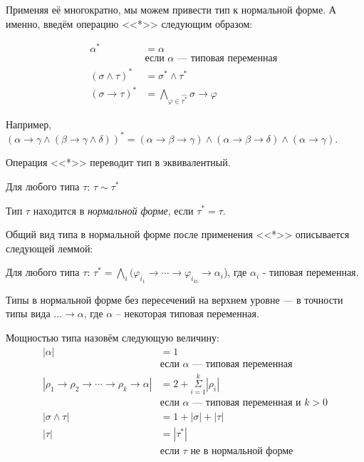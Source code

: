 \documentclass[../main.tex]{subfiles}
\begin{document}
Применяя её многократно, мы можем привести тип к нормальной форме. А именно, введём операцию <<*>> следующим образом: 

\begin{definition}
\begin{align*}
\alpha^* &= \alpha \\
    &\text{если $\alpha$ --- типовая переменная }\\
(\sigma \wedge \tau)^* &= \sigma^* \wedge \tau^*\\
(\sigma \to \tau)^* &= \bigwedge \limits_{\varphi \in \hat{\tau^*}} \sigma \to \varphi
\end{align*}
\end{definition}

Например, $(\alpha \to \gamma \wedge (\beta \to \gamma \wedge \delta))^* = (\alpha \to \beta \to \gamma) \wedge (\alpha \to \beta \to \delta) \wedge (\alpha \to \gamma)$.

Операция <<*>> переводит тип в эквивалентный.

\begin{lemma} \label{normal form}
Для любого типа $\tau$: $\tau \sim \tau^*$
\end{lemma}


\begin{definition}
Тип $\tau$ находится в {\it нормальной форме}, если $\tau^* = \tau$.
\end{definition}

Общий вид типа в нормальной форме после применения <<*>> описывается следующей леммой:

\begin{lemma} \label{normal form form}
Для любого типа $\tau$: $\tau^* = \bigwedge \limits_i (\varphi_i_1 \to \cdots \to \varphi_i_{k i} \to \alpha_i$), где $\alpha_i$ - типовая переменная.
\end{lemma}

\begin{corollary} \label{normal form unit}
Типы в нормальной форме без пересечений на верхнем уровне --- в точности типы вида $\dots \to \alpha$, где $\alpha$ -- некоторая типовая переменная.
\end{corollary}

\begin{definition} \label{typesize}
Мощностью типа назовём следующую величину: 
\begin{align*}
|\alpha| &= 1 \\
         &\text{если $\alpha$ --- типовая переменная }\\
|\rho_1 \to \rho_2 \to \cdots \to \rho_k \to \alpha| &= 2 + \Sigma\limits_{i = 1}^k |\rho_i|\\
                                                     &\text{если $\alpha$ --- типовая переменная и $k > 0$}\\
|\sigma \wedge \tau| &= 1 + |\sigma| + |\tau|\\
|\tau| &= |\tau^*|\\
       &\text{если $\tau$ не в нормальной форме}
\end{align*}
\end{definition}
\end{document}
